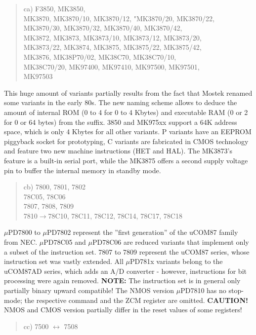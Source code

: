 \documentclass[12pt,twoside]{report}
\newcommand{\bb}[1]{{\bf #1}}
\begin{document}
\begin{quote}
ca) F3850, MK3850, \\
    MK3870, MK3870/10, MK3870/12, "MK3870/20, MK3870/22, \\
    MK3870/30, MK3870/32, MK3870/40, MK3870/42, \\
    MK3872, MK3873, MK3873/10, MK3873/12, MK3873/20, \\
    MK3873/22, MK3874, MK3875, MK3875/22, MK3875/42, \\
    MK3876, MK38P70/02, MK38C70, MK38C70/10, \\
    MK38C70/20, MK97400, MK97410, MK97500, MK97501, \\
    MK97503
\end{quote}
This huge amount of variants partially results from the fact that
Mostek renamed some variants in the early 80s.  The new naming scheme
allows to deduce the amount of internal ROM (0 to 4 for 0 to 4 Kbytes) 
and executable RAM (0 or 2 for 0 or 64 bytes) from the suffix.  3850
and MK975xx support a 64K address space, which is only 4 Kbytes for all
other variants.  P variants have an EEPROM piggyback socket for prototyping,
C variants are fabricated in CMOS technology and feature two new machine
instructions (HET and HAL). The MK3873's feature is a built-in serial port,
while the MK3875 offers a second supply voltage pin to buffer the internal
memory in standby mode.
\begin{quote}
cb) 7800, 7801, 7802 \\
78C05, 78C06 \\
7807, 7808, 7809 \\
7810$\rightarrow$78C10, 78C11, 78C12, 78C14, 78C17, 78C18
\end{quote}
$\mu$PD7800 to $\mu$PD7802 represent the ''first generation'' of the
uCOM87 family from NEC.  $\mu$PD78C05 and $\mu$PD78C06 are reduced
variants that implement only a subset of the instruction set. 7807 to
7809 represent the uCOM87 series, whose instruction set was vastly
extended.  All $\mu$PD781x variants belong to the uCOM87AD series, which
adds an A/D converter - however, instructions for bit processing were
again removed.  \bb{NOTE:} The instruction set is in general only
partially binary upward compatible! The NMOS version $\mu$PD7810 has
no stop-mode; the respective command and the ZCM register are omitted.
\bb{CAUTION!}  NMOS and CMOS version partially differ in the reset
values of some registers!
\begin{quote}
cc) 7500 $\leftrightarrow$ 7508
\end{quote}
\end{document}
